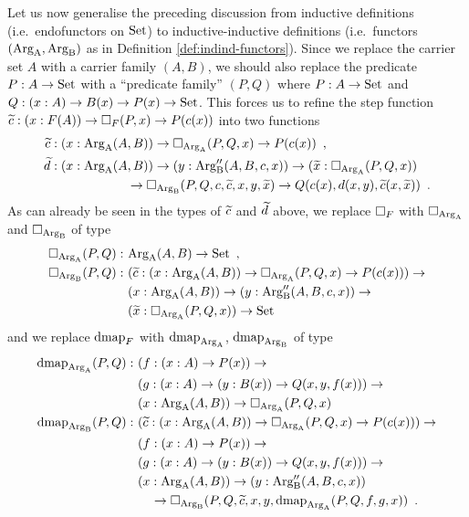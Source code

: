 \documentclass[orivec,envcountsame, ,envcountsect]{llncs}
\begin{document}
Let us now generalise the preceding discussion from inductive
definitions (i.e.\ endo\-functors on $\text{Set}$) to inductive-inductive
definitions (i.e.\ functors $(\text{Arg}_{\text{A}}, \text{Arg}_{\text{B}})$ as in Definition
\ref{def:indind-functors}). Since we replace the carrier set $A$ with
a carrier family $(A, B)$, we should also replace the predicate $P : A
\to \text{Set}$ with a ``predicate family'' $(P, Q)$ where $P : A \to \text{Set}$
and $Q : (x : A) \to B(x) \to P(x) \to \text{Set}$. This forces us to refine
the step function $\widetilde{c} : (x : F(A)) \to \Box_F(P, x) \to P(c(x))$
into two functions
\begin{align*}
  \widetilde{c} &: (x : \text{Arg}_{\text{A}}(A, B)) \to \Box_{\text{Arg}_{\text{A}}}(P, Q, x) \to P(c(x)) \enspace ,\\
  \widetilde{d} &: (x : \text{Arg}_{\text{A}}(A, B)) \to (y : \text{Arg}_{\text{B}}''(A, B, c, x)) \to
                   (\widetilde{x} : \Box_{\text{Arg}_{\text{A}}}(P, Q, x)) \\
              & \qquad\qquad\qquad \to \Box_{\text{Arg}_{\text{B}}}(P, Q, c, \widetilde{c}, x, y, \widetilde{x}) \to Q(c(x), d(x, y), \widetilde{c}(x, \widetilde{x})) \enspace .
\end{align*}
%
As can already be seen in the types of $\widetilde{c}$ and $\widetilde{d}$ above, we replace
$\Box_F$ with $\Box_{\text{Arg}_{\text{A}}}$ and $\Box_{\text{Arg}_{\text{B}}}$ of type
\begin{align*}
  \BOX_{\ArgA}(P, Q) :\ &\ArgA(A, B) \to \Set \enspace ,\\
%
  \BOX_{\ArgB}(P, Q) :\ %
                     &(\stepind{c} : (x : \ArgA(A, B)) \to \BOX_{\ArgA}(P, Q, x) \to P(c(x))) \to \\
                     &(x : \ArgA(A, B)) \to (y : \ArgB''(A, B, c, x)) \to \\
                     & (\stepind{x} : \BOX_{\ArgA}(P, Q, x)) \to \Set
\end{align*} %
%
and we replace $\text{dmap}_F$ with $\text{dmap}_{\text{Arg}_{\text{A}}}$, $\text{dmap}_{\text{Arg}_{\text{B}}}$ of type
\begin{align*}
  \dmap_{\ArgA}(P, Q) :\ & (f : (x : A) \to P(x)) \to \\
                 & (g : (x : A) \to (y : B(x)) \to Q(x, y, f(x))) \to \\
                 & (x : \ArgA(A, B)) \to \BOX_{\ArgA}(P, Q, x) \\
%
  \dmap_{\ArgB}(P, Q) :\ &(\stepind{c} : (x : \ArgA(A, B)) \to \BOX_{\ArgA}(P, Q, x) \to P(c(x))) \to \\
                 & (f : (x : A) \to P(x)) \to \\
                 & (g : (x : A) \to (y : B(x)) \to Q(x, y, f(x))) \to \\
                 & (x : \ArgA(A, B)) \to (y : \ArgB''(A, B, c, x)) \\ 
                 & \quad \to \BOX_{\ArgB}(P, Q, \stepind{c}, x, y, \dmap_{\ArgA}(P, Q, f, g, x)) \enspace .
\end{align*}
\end{document}
